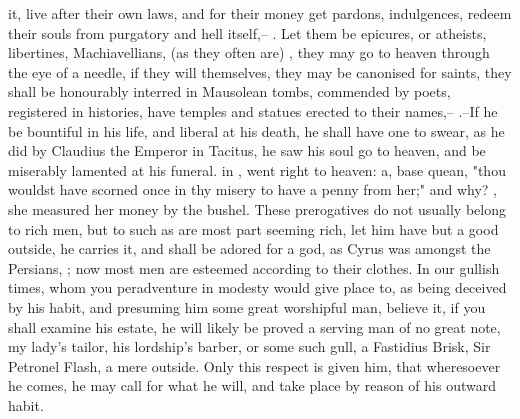 it, live after their own laws, and for their money get pardons, indulgences,
redeem their souls from purgatory and hell itself,-- . Let them be epicures, or atheists, libertines, Machiavellians, (as they
often are) , they may go to heaven through the eye of a needle, if they will
themselves, they may be canonised for saints, they shall be
honourably interred in Mausolean tombs, commended by
poets, registered in histories, have temples and statues erected to their
names,-- .--If he be bountiful in his
life, and liberal at his death, he shall have one to swear, as he did by
Claudius the Emperor in Tacitus, he saw his soul go to heaven, and be miserably
lamented at his funeral. 
in \Petronius {}, went right to heaven: a, base quean,
"thou wouldst have scorned once in thy misery to have a
penny from her;" and why? , she measured her money by
the bushel. These prerogatives do not usually belong to rich men, but to such
as are most part seeming rich, let him have but a good
outside, he carries it, and shall be adored for a god, as
Cyrus was amongst the Persians, ; now most men are esteemed according to their
clothes. In our gullish times, whom you peradventure in modesty would give
place to, as being deceived by his habit, and presuming him some great
worshipful man, believe it, if you shall examine his estate, he will likely be
proved a serving man of no great note, my lady's tailor, his lordship's barber,
or some such gull, a Fastidius Brisk, Sir Petronel Flash, a mere outside. Only
this respect is given him, that wheresoever he comes, he may call for what he
will, and take place by reason of his outward habit.

